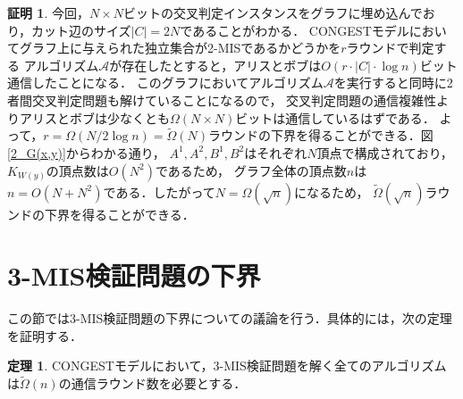 \documentclass[12pt]{thesis}
\newcommand{\CONGEST}{\textsf{CONGEST}}
\theoremstyle{definition}
\newtheorem{theorem}{定理}[chapter]
\newtheorem*{prf*}{証明}
\begin{document}
\begin{prf*}
今回，$N \times N$ビットの交叉判定インスタンスをグラフに埋め込んでおり，カット辺のサイズ$|C| = 2N$であることがわかる．
{\CONGEST}モデルにおいてグラフ上に与えられた独立集合が2-MISであるかどうかを$r$ラウンドで判定する
アルゴリズム$\mathcal{A}$が存在したとすると，アリスとボブは$O(r \cdot |C| \cdot \log n)$ビット通信したことになる．
このグラフにおいてアルゴリズム$\mathcal{A}$を実行すると同時に2者間交叉判定問題も解けていることになるので，
交叉判定問題の通信複雑性よりアリスとボブは少なくとも$\Omega (N \times N)$ビットは通信しているはずである．
よって，$r = \Omega (N / 2\log n) = \tilde{\Omega}(N)$ラウンドの下界を得ることができる．図\ref{2_G(x,y)}からわかる通り，
$A^{1}, A^{2}, B^{1}, B^{2}$はそれぞれ$N$頂点で構成されており，$K_{W(y)}$の頂点数は$O(N^{2})$であるため，
グラフ全体の頂点数$n$は$n = O(N + N^{2})$である．したがって$N = \Omega(\sqrt{n})$になるため，
$\tilde{\Omega}(\sqrt{n})$ラウンドの下界を得ることができる．
\end{prf*}
\newpage

\section{3-MIS検証問題の下界}
この節では3-MIS検証問題の下界についての議論を行う．具体的には，次の定理を証明する．
\begin{theorem}
{\CONGEST}モデルにおいて，3-MIS検証問題を解く全てのアルゴリズムは$\tilde{\Omega} (n)$の通信ラウンド数を必要とする．
\end{theorem}
\end{document}
